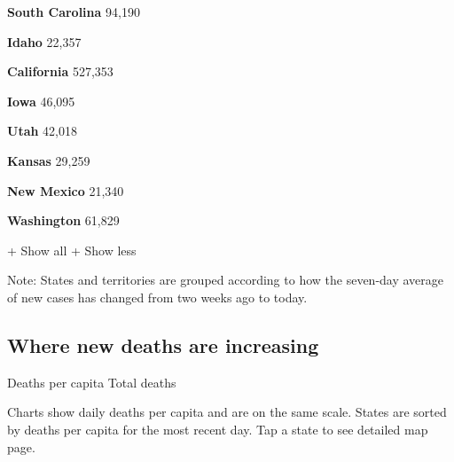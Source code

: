 \href{https://www.nytimes3xbfgragh.onion/interactive/2020/us/south-carolina-coronavirus-cases.html}{}

\textbf{South Carolina} 94,190

\href{https://www.nytimes3xbfgragh.onion/interactive/2020/us/idaho-coronavirus-cases.html}{}

\textbf{Idaho} 22,357

\href{https://www.nytimes3xbfgragh.onion/interactive/2020/us/california-coronavirus-cases.html}{}

\textbf{California} 527,353

\href{https://www.nytimes3xbfgragh.onion/interactive/2020/us/iowa-coronavirus-cases.html}{}

\textbf{Iowa} 46,095

\href{https://www.nytimes3xbfgragh.onion/interactive/2020/us/utah-coronavirus-cases.html}{}

\textbf{Utah} 42,018

\href{https://www.nytimes3xbfgragh.onion/interactive/2020/us/kansas-coronavirus-cases.html}{}

\textbf{Kansas} 29,259

\href{https://www.nytimes3xbfgragh.onion/interactive/2020/us/new-mexico-coronavirus-cases.html}{}

\textbf{New Mexico} 21,340

\href{https://www.nytimes3xbfgragh.onion/interactive/2020/us/washington-coronavirus-cases.html}{}

\textbf{Washington} 61,829

+ Show all + Show less

Note: States and territories are grouped according to how the seven-day
average of new cases has changed from two weeks ago to today.

\hypertarget{where-new-deaths-are-increasing}{%
\subsection{Where new deaths are
increasing}\label{where-new-deaths-are-increasing}}

Deaths per capita Total deaths

Charts show daily deaths per capita and are on the same scale. States
are sorted by deaths per capita for the most recent day. Tap a state to
see detailed map page.

\href{https://www.nytimes3xbfgragh.onion/interactive/2020/us/mississippi-coronavirus-cases.html}{}


